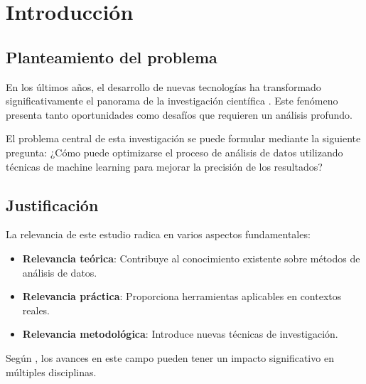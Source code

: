 \chapter{Introducción}

\section{Planteamiento del problema}

En los últimos años, el desarrollo de nuevas tecnologías ha transformado significativamente el panorama de la investigación científica \citep{autor2023}. Este fenómeno presenta tanto oportunidades como desafíos que requieren un análisis profundo.

El problema central de esta investigación se puede formular mediante la siguiente pregunta: ¿Cómo puede optimizarse el proceso de análisis de datos utilizando técnicas de machine learning para mejorar la precisión de los resultados?

\section{Justificación}

La relevancia de este estudio radica en varios aspectos fundamentales:

\begin{itemize}
    \item \textbf{Relevancia teórica}: Contribuye al conocimiento existente sobre métodos de análisis de datos.
    \item \textbf{Relevancia práctica}: Proporciona herramientas aplicables en contextos reales.
    \item \textbf{Relevancia metodológica}: Introduce nuevas técnicas de investigación.
\end{itemize}

Según \citet{otroautor2022}, los avances en este campo pueden tener un impacto significativo en múltiples disciplinas.

